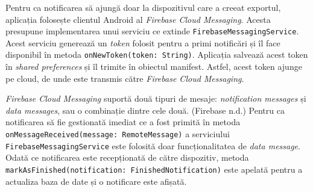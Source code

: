 Pentru ca notificarea să ajungă doar la dispozitivul care a creeat exportul, aplicația folosește clientul Android al \emph{Firebase Cloud Messaging}. Acesta presupune implementarea unui serviciu ce extinde \texttt{FirebaseMessagingService}. Acest serviciu generează un \emph{token} folosit pentru a primi notificări și îl face disponibil în metoda \texttt{onNewToken(token:\ String)}. Aplicația salvează acest token în \emph{shared preferences} și îl trimite în obiectul manifest. Astfel, acest token ajunge pe cloud, de unde este transmis către \emph{Firebase Cloud Messaging}.

\emph{Firebase Cloud Messaging} suportă două tipuri de mesaje: \emph{notification messages} și \emph{data messages}, sau o combinație dintre cele două. (Firebase n.d.) Pentru ca notificarea să fie gestionată imediat ce a fost primită în metoda \texttt{onMessageReceived(message:\ RemoteMessage)} a serviciului \texttt{FirebaseMessagingService} este folosită doar funcționalitatea de \emph{data message}. Odată ce notificarea este recepționată de către dispozitiv, metoda \texttt{markAsFinished(notification:\ FinishedNotification)} este apelată pentru a actualiza baza de date și o notificare este afișată.

